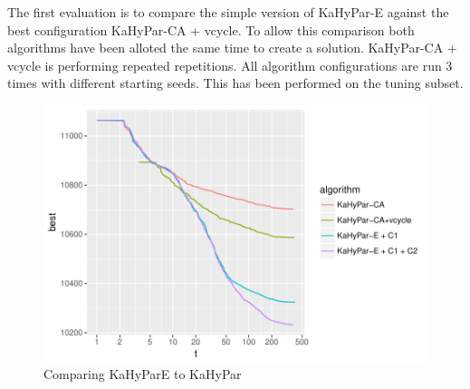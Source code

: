 \documentclass[a4paper,12pt,titlepage, BCOR7mm,headsepline]{scrbook}
\numberwithin{equation}{section}
\begin{document}
The first evaluation is to compare the simple version of KaHyPar-E against the best configuration KaHyPar-CA + vcycle. To allow this comparison both algorithms have been alloted the same time to create a solution. KaHyPar-CA + vcycle is performing repeated repetitions. All algorithm configurations are run 3 times with different starting seeds. This has been performed on the tuning subset. 
\begin{figure}[H]
\caption{Comparing KaHyParE to KaHyPar}
\begin{center}
\includegraphics{bachelorarbeit-basiccomparation}
\end{center}

\end{figure}
\end{document}
